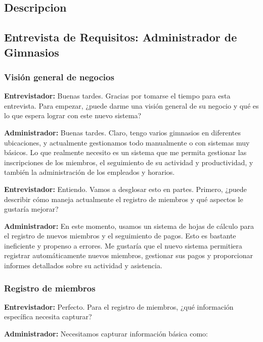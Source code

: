 \documentclass[spanish, 12pt]{article}
\begin{document}
	\subsection{Descripcion}
	\label{descripcion}

	\subsection{Entrevista de Requisitos: Administrador de Gimnasios}
	\label{entrevista-de-requisitos-administrador-de-gimnasios}

	\subsubsection{Visión general de negocios}
	\label{visiuxf3n-general-de-negocios}

	\textbf{Entrevistador:} Buenas tardes. Gracias por tomarse el tiempo para esta
	entrevista. Para empezar, ¿puede darme una visión general de su negocio y qué es
	lo que espera lograr con este nuevo sistema?

	\textbf{Administrador:} Buenas tardes. Claro, tengo varios gimnasios en
	diferentes ubicaciones, y actualmente gestionamos todo manualmente o con sistemas
	muy básicos. Lo que realmente necesito es un sistema que me permita gestionar
	las inscripciones de los miembros, el seguimiento de su actividad y productividad,
	y también la administración de los empleados y horarios.

	\textbf{Entrevistador:} Entiendo. Vamos a desglosar esto en partes. Primero,
	¿puede describir cómo maneja actualmente el registro de miembros y qué
	aspectos le gustaría mejorar?

	\textbf{Administrador:} En este momento, usamos un sistema de hojas de cálculo
	para el registro de nuevos miembros y el seguimiento de pagos. Esto es bastante
	ineficiente y propenso a errores. Me gustaría que el nuevo sistema permitiera
	registrar automáticamente nuevos miembros, gestionar sus pagos y proporcionar informes
	detallados sobre su actividad y asistencia.

	\subsubsection{Registro de miembros}
	\label{registro-de-miembros}

	\textbf{Entrevistador:} Perfecto. Para el registro de miembros, ¿qué información
	específica necesita capturar?

	\textbf{Administrador:} Necesitamos capturar información básica como:
\end{document}
